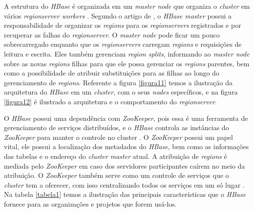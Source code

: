             A estrutura do \textit{HBase} é organizada em um \textit{master node} que organiza o \textit{cluster} em vários
            \textit{regionserver workers} \cite{carstoiu2010}. Segundo o artigo de , o \textit{HBase
            master} possui a responsabilidade de organizar os \textit{regions} para os \textit{regionservers} registrados e por
            recuperar as falhas do \textit{regionserver}. O \textit{master node} pode ficar um pouco sobrecarregado enquanto
            que os \textit{regionservers} carregam \textit{regions} e requisições de leitura e escrita. Eles também gerenciam
            \textit{region splits}, informando ao \textit{master node} sobre as novas \textit{regions} filhas para que ele possa
            gerenciar os \textit{regions} parentes, bem como a possibilidade de atribuir substituições para as filhas ao longo do
            gerenciamento de \textit{regions}. Referente a figura \ref{figura11} temos a ilustração da arquitetura do \textit{HBase}
            em um \textit{cluster}, com o seus \textit{nodes} específicos, e na figura \ref{figura12} é ilustrado a arquitetura e o
            comportamento do \textit{regionserver}.

            O \textit{HBase} possui uma dependência com \textit{ZooKeeper}, pois essa é uma ferramenta de gerenciamento
            de serviços distribuídos, e o \textit{HBase} controla as instâncias do \textit{ZooKeeper} para manter o controle no
            cluster \cite{george2011}.  O \textit{ZooKeeper} possui um papel vital, ele possui a localização dos metadados do
            \textit{HBase}, bem como as informações das tabelas e o endereço do \textit{cluster master} atual. A atribuição de
            \textit{regions} é mediada pelo \textit{ZooKeeper} em caso dos servidores participantes caírem no meio da atribuição.
            O \textit{ZooKeeper} também serve como um controle de serviços que o \textit{cluster} tem a oferecer, com isso
            centralizando todos os serviços em um só lugar \cite{vora2011}. Na tabela \ref{tabela1} temos a ilustração das
            principais características que o \textit{HBase} fornece para as organizações e projetos que forem usá-los.

